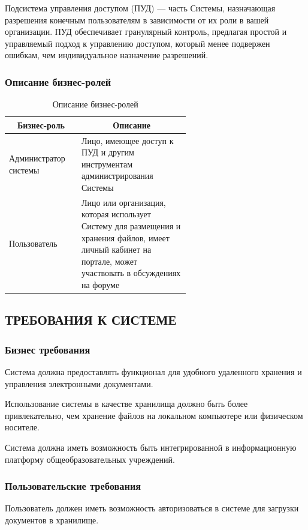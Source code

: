 \documentclass[a4paper,14pt]{extarticle}
\begin{document}
Подсистема управления доступом (ПУД) --- часть Системы, назначающая разрешения конечным пользователям в зависимости от их роли в вашей организации. ПУД обеспечивает гранулярный контроль, предлагая простой и управляемый подход к управлению доступом, который менее подвержен ошибкам, чем индивидуальное назначение разрешений.

\subsubsection{Описание бизнес-ролей}
\begin{table}[h!]
	\caption{Описание бизнес-ролей}\label{tab:roles}
	\begin{tabular}{|l|p{0.6\linewidth}|}
		\hline 
		\multicolumn{1}{|c|}{\textbf{Бизнес-роль}} & \multicolumn{1}{c|}{\textbf{Описание}}\\ \hline\hline
		Администратор системы & Лицо, имеющее доступ к ПУД и другим инструментам администрирования Системы \\ \hline
		Пользователь & Лицо или организация, которая использует Систему для размещения и хранения файлов, имеет личный кабинет на портале, может участвовать в обсуждениях на форуме\\ \hline
	\end{tabular}
\end{table}


\subsection{ТРЕБОВАНИЯ К СИСТЕМЕ}
\subsubsection{Бизнес требования}

Система должна предоставлять функционал для удобного удаленного хранения и управления электронными документами.

Использование системы в качестве хранилища должно быть более привлекательно, чем хранение файлов на локальном компьютере или физическом носителе.

Система должна иметь возможность быть интегрированной в информационную платформу общеобразовательных учреждений.


\subsubsection{Пользовательские требования}
Пользователь должен иметь возможность авторизоваться в системе для загрузки документов в хранилище.
\end{document}

